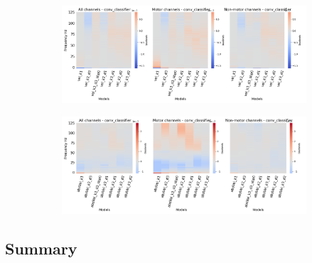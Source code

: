 \begin{figure}[!hpbp]
\begin{subfigure}[a]{\textwidth}
   \includegraphics[width=1\linewidth]{img/ch4/vel-pw-last-layer-grads}
   \caption{}
\end{subfigure}\label{fig:vel-pw-last-layer-grads}

\begin{subfigure}[b]{\textwidth}
   \includegraphics[width=1\linewidth]{img/ch4/absVel-pw-last-layer-grads}
   \caption{}
\end{subfigure}\label{fig:absVel-pw-last-layet-grads}
\caption[]{}
\end{figure}\label{fig:pw-last-layer-grads}

\subsection{Summary}\label{subsec:pw-summary}